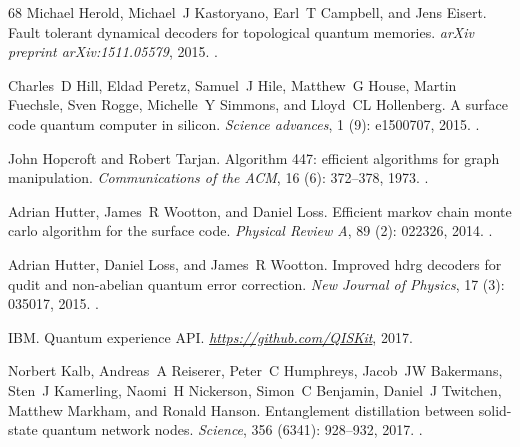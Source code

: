 \documentclass[a4paper, 10pt, accepted=2021-11-03]{quantumarticle}
\begin{document}
{\begin{thebibliography}{68}
Michael Herold, Michael~J Kastoryano, Earl~T Campbell, and Jens Eisert.
\newblock Fault tolerant dynamical decoders for topological quantum memories.
\newblock \emph{arXiv preprint arXiv:1511.05579}, 2015.
\newblock {}.

Charles~D Hill, Eldad Peretz, Samuel~J Hile, Matthew~G House, Martin Fuechsle,
  Sven Rogge, Michelle~Y Simmons, and Lloyd~CL Hollenberg.
\newblock A surface code quantum computer in silicon.
\newblock \emph{Science advances}, 1 (9): e1500707, 2015.
\newblock {}.

John Hopcroft and Robert Tarjan.
\newblock Algorithm 447: efficient algorithms for graph manipulation.
\newblock \emph{Communications of the ACM}, 16 (6): 372--378,
  1973.
\newblock {}.

Adrian Hutter, James~R Wootton, and Daniel Loss.
\newblock Efficient markov chain monte carlo algorithm for the surface code.
\newblock \emph{Physical Review A}, 89 (2): 022326, 2014.
\newblock {}.

Adrian Hutter, Daniel Loss, and James~R Wootton.
\newblock Improved hdrg decoders for qudit and non-abelian quantum error
  correction.
\newblock \emph{New Journal of Physics}, 17 (3): 035017,
  2015.
\newblock {}.

IBM.
\newblock Quantum experience {API}.
\newblock \emph{\href{https://github.com/QISKit}{https://github.com/QISKit}},
  2017.

Norbert Kalb, Andreas~A Reiserer, Peter~C Humphreys, Jacob~JW Bakermans, Sten~J
  Kamerling, Naomi~H Nickerson, Simon~C Benjamin, Daniel~J Twitchen, Matthew
  Markham, and Ronald Hanson.
\newblock Entanglement distillation between solid-state quantum network nodes.
\newblock \emph{Science}, 356 (6341): 928--932, 2017.
\newblock {}.


\end{thebibliography}}
\end{document}
